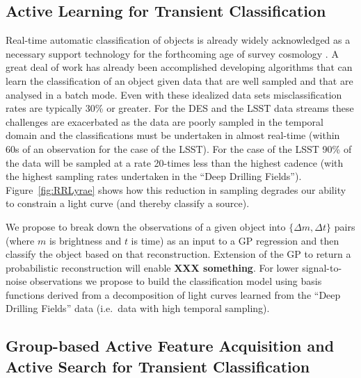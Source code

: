 \documentclass[prd,nofootbib,floatfix,11pt,tightenlines]{revtex4}
\begin{document}
\subsection{Active Learning for Transient Classification}

Real-time automatic classification of objects is already widely
acknowledged as a necessary support technology for the forthcoming age
of survey cosmology
\cite{djorgovski2011,richards2011,richards2012,graham2012,mahabal2008a,mahabal2011a}.
A great deal of work has already been accomplished developing
algorithms that can learn the classification of an object given data
that are well sampled and that are analysed in a batch mode. Even with these
idealized data sets misclassification rates are typically 30\% or
greater.  For the DES and the LSST data streams these challenges
are exacerbated as the data are poorly sampled in the temporal domain
and the classifications must be undertaken in almost real-time (within
60s of an observation for the case of the LSST).  For the case of the
LSST 90\% of the data will be sampled at a rate 20-times less than the
highest cadence (with the highest sampling rates undertaken in the
``Deep Drilling Fields'').  Figure~\ref{fig:RRLyrae} shows how this
reduction in sampling degrades our ability to constrain a light curve
(and thereby classify a source).

We propose to break down the observations of a given object into
$\{\Delta m,\Delta t\}$ pairs (where $m$ is brightness and $t$ is
time) as an input to a GP regression and then classify the object
based on that reconstruction. Extension of the GP to return a
probabilistic reconstruction will enable {\bf XXX something}. For
lower signal-to-noise observations we propose to build the
classification model using basis functions derived from a
decomposition of light curves learned from the ``Deep Drilling
Fields'' data (i.e.\ data with high temporal sampling).


\subsection{Group-based Active Feature Acquisition and Active Search
for Transient Classification}
\end{document}
